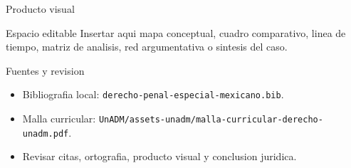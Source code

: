\documentclass[
  spanish,
  aspectratio=169,
  xcolor={dvipsnames,table}
]{beamer}
\begin{document}
\begin{frame}{Producto visual}
  \begin{block}{Espacio editable}
    Insertar aqui mapa conceptual, cuadro comparativo, linea de tiempo,
    matriz de analisis, red argumentativa o sintesis del caso.
  \end{block}
  \centering
\end{frame}

\begin{frame}{Fuentes y revision}
  \begin{itemize}
    \item Bibliografia local: \texttt{derecho-penal-especial-mexicano.bib}.
    \item Malla curricular: \texttt{UnADM/assets-unadm/malla-curricular-derecho-unadm.pdf}.
    \item Revisar citas, ortografia, producto visual y conclusion juridica.
  \end{itemize}
\end{frame}
\end{document}
